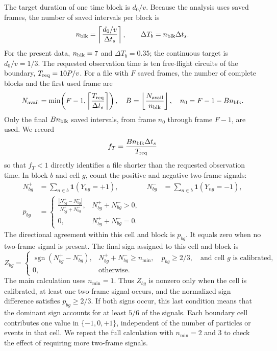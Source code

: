 \documentclass[11pt]{article}
\numberwithin{equation}{section}
\begin{document}
The target duration of one time block is $d_0/v$.  Because the analysis uses
saved frames, the number of saved intervals per block is
\begin{equation}
  n_{\rm blk}=\left\lceil\frac{d_0/v}{\Delta t_s}\right\rceil,
  \qquad
  \Delta T_b=n_{\rm blk}\Delta t_s.
  \label{eq:boundary_block_time}
\end{equation}
For the present data, $n_{\rm blk}=7$ and $\Delta T_b=0.35$; the continuous
target is $d_0/v=1/3$.  The requested observation time is ten free-flight
circuits of the boundary, $T_{\rm req}=10P/v$.  For a file with $F$ saved
frames, the number of complete blocks and the first used frame are
\begin{equation}
 N_{\rm avail}=\min\!\left(F-1,
 \left\lceil\frac{T_{\rm req}}{\Delta t_s}\right\rceil\right),
 \quad
 B=\left\lfloor\frac{N_{\rm avail}}{n_{\rm blk}}\right\rfloor,
 \quad
 n_0=F-1-Bn_{\rm blk}.
 \label{eq:terminal_window_blocks}
\end{equation}
Only the final $Bn_{\rm blk}$ saved intervals, from frame $n_0$ through frame
$F-1$, are used.  We record
\begin{equation}
 f_T=\frac{Bn_{\rm blk}\Delta t_s}{T_{\rm req}}
 \label{eq:analysis_window_fraction}
\end{equation}
so that $f_T<1$ directly identifies a file shorter than the requested
observation time.  In block $b$ and cell $g$, count the positive and negative
two-frame signals:
\begin{align}
  N_{bg}^{+}&=\sum_{n\in b}\mathbf 1(Y_{ng}=+1),
  &
  N_{bg}^{-}&=\sum_{n\in b}\mathbf 1(Y_{ng}=-1),
  \label{eq:block_sign_counts}\\
  p_{bg}&=
  \begin{cases}
  \displaystyle
  \frac{|N_{bg}^{+}-N_{bg}^{-}|}{N_{bg}^{+}+N_{bg}^{-}},
  &N_{bg}^{+}+N_{bg}^{-}>0,\\[0.6em]
  0,&N_{bg}^{+}+N_{bg}^{-}=0.
  \end{cases}
  \label{eq:block_conditional_purity}
\end{align}
The directional agreement within this cell and block is $p_{bg}$.  It equals
zero when no two-frame signal is present.  The final sign assigned to this cell
and block is
\begin{equation}
  Z_{bg}=\begin{cases}
  \operatorname{sgn}(N_{bg}^{+}-N_{bg}^{-}),
  &N_{bg}^{+}+N_{bg}^{-}\ge n_{\min},\quad
   p_{bg}\ge2/3,\quad \text{and cell $g$ is calibrated},\\
  0,&\text{otherwise}.
  \end{cases}
  \label{eq:block_gate_sign}
\end{equation}
The main calculation uses $n_{\min}=1$.  Thus $Z_{bg}$ is nonzero only when the
cell is calibrated, at least one two-frame signal occurs, and the normalized
sign difference satisfies $p_{bg}\ge2/3$.  If both signs occur, this last
condition means that the dominant sign accounts for at least $5/6$ of the
signals.  Each boundary cell contributes one value in $\{-1,0,+1\}$,
independent of the number of particles or events in that cell.  We repeat the
full calculation with $n_{\min}=2$ and $3$ to check the effect of requiring
more two-frame signals.
\end{document}
